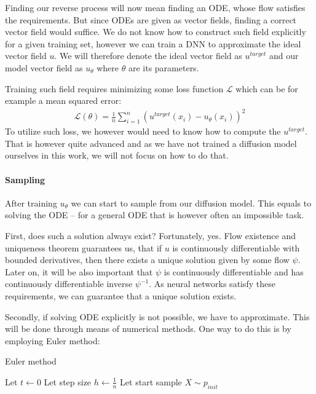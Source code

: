 Finding our reverse process will now mean finding an ODE, whose flow satisfies the requirements.
But since ODEs are given as vector fields, finding a correct vector field would suffice. We do not know how to construct such field explicitly for a given training set, however we can train a DNN to approximate the ideal vector field $u$. We will therefore denote the ideal vector field as $u^{target}$ and our model vector field as $u_\theta$ where $\theta$ are its parameters.

Training such field requires minimizing some loss function $\mathcal{L}$ which can be for example a mean squared error:
\begin{align*}
    \mathcal{L}(\theta) = \frac{1}{n} \sum_{i = 1}^n (u^{target}(x_i) - u_\theta(x_i))^2
\end{align*}
To utilize such loss, we however would need to know how to compute the $u^{target}$. That is however quite advanced and as we have not trained a diffusion model ourselves in this work, we will not focus on how to do that.

\paragraph{Sampling}
After training $u_\theta$ we can start to sample from our diffusion model. This equals to solving the ODE -- for a general ODE that is however often an impossible task.

First, does such a solution always exist? Fortunately, yes. Flow existence and uniqueness theorem guarantees us, that if $u$ is continuously differentiable with bounded derivatives, then there exists a unique solution given by some flow $\psi$. Later on, it will be also important that $\psi$ is continuously differentiable and has continuously differentiable inverse $\psi^{-1}$. As neural networks satisfy these requirements, we can guarantee that a unique solution exists.

Secondly, if solving ODE explicitly is not possible, we have to approximate. This will be done through means of numerical methods. One way to do this is by employing Euler method:

\begin{algorithm}[H]
\DontPrintSemicolon
{}

\caption{Euler method}


\BlankLine

Let \(t \gets 0 \) \;
Let step size \(h \gets \frac{1}{n} \) \;
Let start sample \(X \sim p_{init} \)\;


\end{algorithm}

